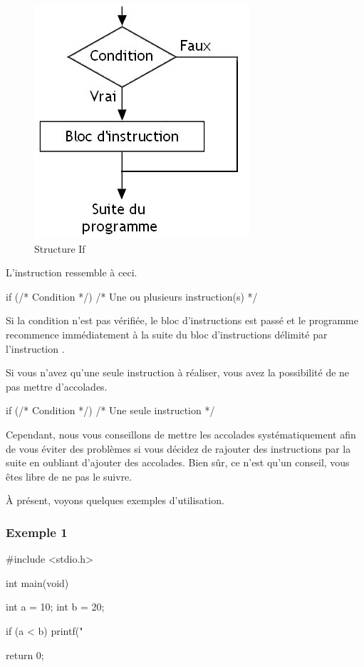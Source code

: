 \begin{figure}[htbp]
\centering
\includegraphics[scale=0.4]{images/boucle_condition.jpg}
\caption{Structure If}
\end{figure}

L'instruction  ressemble à ceci.

\begin{C}
if (/* Condition */)
{
    /* Une ou plusieurs instruction(s) */
}
\end{C}

Si la condition n'est pas vérifiée, le bloc d'instructions est passé et
le programme recommence immédiatement à la suite du bloc d'instructions
délimité par l'instruction .

Si vous n'avez qu'une seule instruction à réaliser, vous avez la
possibilité de ne pas mettre d'accolades.

\begin{C}
if (/* Condition */)
    /* Une seule instruction */
\end{C}

Cependant, nous vous conseillons de mettre les accolades
systématiquement afin de vous éviter des problèmes si vous décidez de
rajouter des instructions par la suite en oubliant d'ajouter des
accolades. Bien sûr, ce n'est qu'un conseil, vous êtes libre de ne pas
le suivre.

À présent, voyons quelques exemples d'utilisation.

\subsubsection{Exemple 1}
\label{exemple-1}

\begin{C}
#include <stdio.h>


int main(void)
{
    int a = 10;
    int b = 20;

    if (a < b)
    {
        printf("%
    }

    return 0;
}
\end{C}

